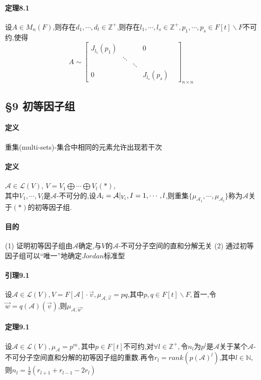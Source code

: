\documentclass{ctexart}
\begin{document}
\paragraph{定理8.1}
设$A\in M_{n}(F)$,则存在$d_{1},\cdots,d_{l}\in \mathbb{Z}^{+}$,则存在$l_{1},\cdots,l_{s} \in \mathbb{Z}^{+},p_{1},\cdots,p_{s} \in F[t]\backslash F$不可约,使得
$$
 A \sim
 \left[
 \begin{matrix}
  J_{l_{1}}(p_{1}) &   &   & 0 \\
    & \ddots &   &   & \\
     &   & \ddots &   &  \\
  0 &   &    & J_{l_{s}}(p_{s})
  \end{matrix}
  \right]_{n\times n}
$$

\subsection{§9 初等因子组}

\paragraph{定义}

重集(multi-sets)-集合中相同的元素允许出现若干次

\paragraph{定义}

$\mathcal{A} \in \mathcal{L}(V)$,
$V=V_{1}\bigoplus \cdots \bigoplus V_{l} (*)$,\\
其中$V_{1},\cdots,V_{l}$是$\mathcal{A}$-不可分的,设$A_{i}=\mathcal{A}\arrowvert_{V_{i}},I=1,\cdots,l$,则重集$\{ \mu_{\mathcal{A}_{1}},\cdots,\mu_{\mathcal{A}_{l}}\}$称为$\mathcal{A}$关于$(*)$的初等因子组.

\paragraph{目的}

(1) 证明初等因子组由$\mathcal{A}$确定,与$V$的$\mathcal{A}$-不可分子空间的直和分解无关
(2) 通过初等因子组可以“唯一”地确定$Jordan$标准型

\paragraph{引理9.1}

设$\mathcal{A} \in \mathcal{L}(V),V=F[\mathcal{A}] \cdot \vec{v},\mu_{\mathcal{A},\vec{v}}=pq$,其中$p,q \in F[t] \backslash F,$首一,令$\vec{w}=q(\mathcal{A})(\vec{v})$,则$\mu_{\mathcal{A},\vec{w}}$.

\paragraph{定理9.1}

设$\mathcal{A} \in \mathcal{L}(V),\mu_{\mathcal{A}}=p^{m},$其中$p \in F[t]$不可约,对$\forall l \in \mathbb{Z}^{+},$令$n_{l}$为$p^{l}$是$\mathcal{A}$关于某个$\mathcal{A}$-不可分子空间直和分解的初等因子组的重数.再令$r_{l}=rank(p(\mathcal{A})^{l})$,其中$l \in \mathbb{N}$,则$n_{l}=\frac{1}{d}(r_{l+1}+r_{l-1}-2r_{l})$
\end{document}
